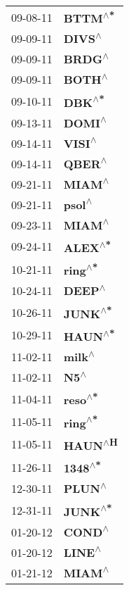 \begin{supertabular}{p{0.08\textwidth}p{0.2\textwidth}}
 09-08-11 &   \textbf{BTTM\textsuperscript{$\wedge$*}} \\
 09-09-11 &    \textbf{DIVS\textsuperscript{$\wedge$}} \\
 09-09-11 &    \textbf{BRDG\textsuperscript{$\wedge$}} \\
 09-09-11 &    \textbf{BOTH\textsuperscript{$\wedge$}} \\
 09-10-11 &    \textbf{DBK\textsuperscript{$\wedge$*}} \\
 09-13-11 &    \textbf{DOMI\textsuperscript{$\wedge$}} \\
 09-14-11 &    \textbf{VISI\textsuperscript{$\wedge$}} \\
 09-14-11 &    \textbf{QBER\textsuperscript{$\wedge$}} \\
 09-21-11 &    \textbf{MIAM\textsuperscript{$\wedge$}} \\
 09-21-11 &    \textbf{psol\textsuperscript{$\wedge$}} \\
 09-23-11 &    \textbf{MIAM\textsuperscript{$\wedge$}} \\
 09-24-11 &   \textbf{ALEX\textsuperscript{$\wedge$*}} \\
 10-21-11 &   \textbf{ring\textsuperscript{$\wedge$*}} \\
 10-24-11 &    \textbf{DEEP\textsuperscript{$\wedge$}} \\
 10-26-11 &   \textbf{JUNK\textsuperscript{$\wedge$*}} \\
 10-29-11 &   \textbf{HAUN\textsuperscript{$\wedge$*}} \\
 11-02-11 &    \textbf{milk\textsuperscript{$\wedge$}} \\
 11-02-11 &      \textbf{N5\textsuperscript{$\wedge$}} \\
 11-04-11 &   \textbf{reso\textsuperscript{$\wedge$*}} \\
 11-05-11 &   \textbf{ring\textsuperscript{$\wedge$*}} \\
 11-05-11 &   \textbf{HAUN\textsuperscript{$\wedge$H}} \\
 11-26-11 &   \textbf{1348\textsuperscript{$\wedge$*}} \\
 12-30-11 &    \textbf{PLUN\textsuperscript{$\wedge$}} \\
 12-31-11 &   \textbf{JUNK\textsuperscript{$\wedge$*}} \\
 01-20-12 &    \textbf{COND\textsuperscript{$\wedge$}} \\
 01-20-12 &    \textbf{LINE\textsuperscript{$\wedge$}} \\
 01-21-12 &    \textbf{MIAM\textsuperscript{$\wedge$}} \\

\end{supertabular}
